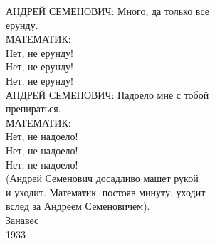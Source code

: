     \hspace{1cm}АНДРЕЙ СЕМЕНОВИЧ:  Много,  да только все \\
ерунду. \\
    \hspace{1cm}МАТЕМАТИК: \\
          \hspace{2cm}Нет, не ерунду! \\
          \hspace{2cm}Нет, не ерунду! \\
          \hspace{2cm}Нет, не ерунду! \\
    \hspace{1cm}АНДРЕЙ СЕМЕНОВИЧ:  Надоело  мне с  тобой \\
препираться. \\
    \hspace{1cm}МАТЕМАТИК: \\
          \hspace{2cm}Нет, не надоело! \\
          \hspace{2cm}Нет, не надоело! \\
          \hspace{2cm}Нет, не надоело! \\
    \hspace{1cm}(Андрей Семенович досадливо машет  рукой \\
и уходит.  Математик, постояв минуту, уходит \\
вслед за Андреем Семеновичем). \\
                  \hspace{3cm}Занавес \\
                                        \hspace{7cm}1933